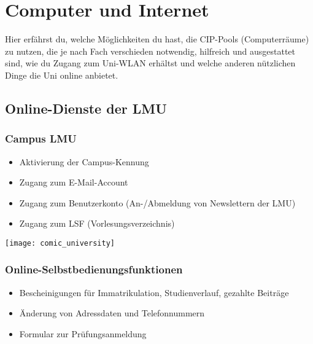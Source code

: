 ﻿\chapter{Computer und Internet}
Hier erfährst du, welche Möglichkeiten du hast, die CIP-Pools (Computerräume) zu nutzen, die je nach Fach verschieden notwendig, hilfreich und ausgestattet sind, wie du Zugang zum Uni-WLAN erhältst 
und welche anderen nützlichen Dinge die Uni online anbietet.

\section{Online-Dienste der LMU}
\subsection*{Campus LMU}
\begin{itemize}
	\item Aktivierung der Campus-Kennung
	\item Zugang zum E-Mail-Account
	\item Zugang zum Benutzerkonto (An-/Abmeldung von Newslettern der LMU)
	\item Zugang zum LSF (Vorlesungsverzeichnis)
\end{itemize}
\begin{urlList}
\end{urlList}

\begin{center}
	{\texttt{[image: comic\_university]}}
\end{center}

\subsection*{Online-Selbstbedienungsfunktionen}
\begin{itemize}
	\item Bescheinigungen für Immatrikulation, Studienverlauf, gezahlte Beiträge
	\item Änderung von Adressdaten und Telefonnummern
	\item Formular zur Prüfungsanmeldung
\end{itemize}
\begin{urlList}
\end{urlList}

